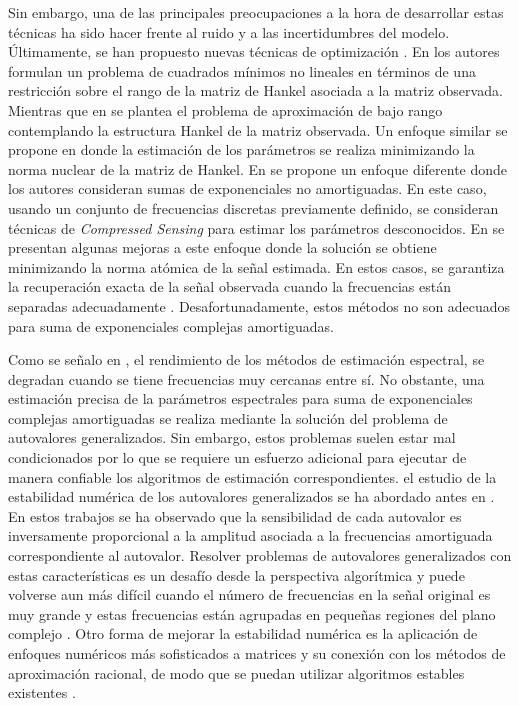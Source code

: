 Sin embargo, una de las principales preocupaciones a la hora de desarrollar estas técnicas ha sido hacer frente al ruido y a las incertidumbres del modelo. Últimamente, se han propuesto nuevas técnicas de optimización \cite{Andersson2014, Grussler2018}. En \cite{Andersson2014} los autores formulan un problema de cuadrados mínimos no lineales en términos de una restricción sobre el rango de la matriz de Hankel asociada a la matriz observada. Mientras que en \cite{Grussler2018} se plantea el problema de aproximación de bajo rango contemplando la estructura Hankel de la matriz observada. Un enfoque similar se propone en \cite{Ying2018} donde la estimación de los parámetros se realiza minimizando la norma nuclear de la matriz de Hankel. En \cite{Yang2018} se propone un enfoque diferente donde los autores consideran sumas de exponenciales no amortiguadas. En este caso, usando un conjunto de frecuencias discretas previamente definido, se consideran técnicas de \emph{Compressed Sensing} \cite{Donoho2006} para estimar los parámetros desconocidos. En \cite{Yang2015,Yang2016} se presentan algunas mejoras a este enfoque donde la solución se obtiene minimizando la norma atómica de la señal estimada. En estos casos, se garantiza la recuperación exacta de la señal observada cuando la frecuencias están separadas adecuadamente \cite{Candes2014}. Desafortunadamente, estos métodos no son adecuados para suma de exponenciales complejas amortiguadas.

Como se señalo en \cite{Halder1997}, el rendimiento de los métodos de estimación espectral, se degradan cuando se tiene frecuencias muy cercanas entre sí. No obstante, una estimación precisa de la parámetros espectrales para suma de exponenciales complejas amortiguadas se realiza mediante la solución del problema de autovalores generalizados. Sin embargo, estos problemas suelen estar mal condicionados por lo que se requiere un esfuerzo adicional para ejecutar de manera confiable los algoritmos de estimación correspondientes. el estudio de la estabilidad numérica  de los autovalores generalizados se ha abordado antes en \cite{Golub1999, Beckermann2007}. En estos trabajos se ha observado que la sensibilidad de cada autovalor es inversamente proporcional a la amplitud asociada a la frecuencias amortiguada correspondiente al autovalor. Resolver problemas de autovalores generalizados con estas características es un desafío desde la perspectiva algorítmica y puede volverse aun más difícil cuando el número de frecuencias en la señal original es muy grande y estas frecuencias están agrupadas en pequeñas regiones del plano complejo \cite{Cuyt2018, BATENKOV2018, Li1997}. Otro forma de mejorar la estabilidad numérica es la aplicación de enfoques numéricos más sofisticados a matrices y su conexión con los métodos de aproximación racional, de modo que se puedan utilizar algoritmos estables existentes \cite{Derevianko2022}.

